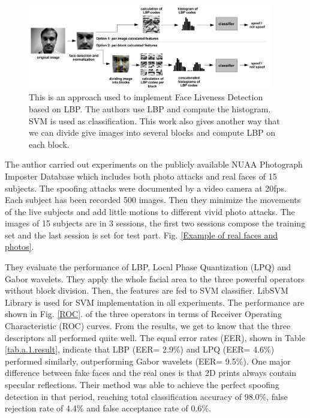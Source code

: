 \documentclass[journal]{IEEEtran}
\begin{document}
\begin{figure}[htbp]
\centering
\includegraphics[width=0.95\textwidth]{img/2-A-(1).png}
\caption{This is an approach \cite{chingovska2012effectiveness} used to implement Face Liveness Detection based on LBP. The authors use LBP and compute the histogram. SVM is used as classification. This work also gives another way that we can divide give images into several blocks and compute LBP on each block.}
\label{lbp_based_approach}
\end{figure}

The author carried out experiments on the publicly available NUAA Photograph Imposter Database\cite{tan2010face} which includes both photo attacks and real faces of 15 subjects. The spoofing attacks were documented by a video camera at 20fps. Each subject has been recorded 500 images. Then they minimize the movements of the live subjects and add little motions to different vivid photo attacks. The images of 15 subjects are  in 3 sessions, the first two sessions compose the training set and the last session is set for test part. Fig. \ref{Example of real faces and photos}. 

They evaluate the performance of LBP, Local Phase Quantization (LPQ) and Gabor wavelets. They apply the whole facial area to the three powerful operators without block division. Then, the features are fed to SVM classifier. LibSVM Library is used for SVM implementation in all experiments. The performance are shown in Fig. \ref{ROC}. of the three operators in terms of Receiver Operating Characteristic (ROC) curves. From the results, we get to know that the three descriptors all performed quite well. The equal error rates (EER), shown in Table \ref{tab.a.1.result}, indicate that LBP (EER= 2.9\%) and LPQ (EER= 4.6\%) performed similarly, outperforming Gabor wavelets (EER= 9.5\%). One major difference between fake faces and the real ones is that 2D prints always contain specular reflections. Their method was able to achieve the perfect spoofing detection in that period, reaching total classification accuracy of 98.0\%, false rejection rate of 4.4\% and false acceptance rate of 0.6\%\cite{maatta2011face}.
\end{document}
